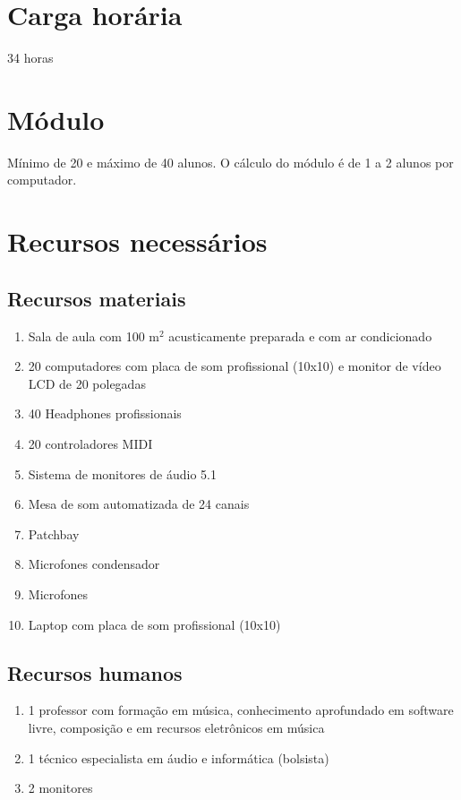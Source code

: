 \documentclass[12pt]{article}
\begin{document}
\section{Carga horária}

34 horas
 
\section{Módulo}

Mínimo de 20 e máximo de 40 alunos. O cálculo do módulo é de 1 a 2
alunos por computador.

\section{Recursos necessários}
\label{sec:material}

\subsection{Recursos materiais}

\begin{enumerate}
\item Sala de aula com 100 m$^2$ acusticamente preparada e com ar
  condicionado
\item 20 computadores com placa de som profissional (10x10) e monitor
  de vídeo LCD de 20 polegadas
\item 40 Headphones profissionais
\item 20 controladores MIDI
\item Sistema de monitores de áudio 5.1
\item Mesa de som automatizada de 24 canais
\item Patchbay
\item Microfones condensador
\item Microfones
\item Laptop com placa de som profissional (10x10)
\end{enumerate}

\subsection{Recursos humanos}

\begin{enumerate}
\item 1 professor com formação em música, conhecimento aprofundado em
  software livre, composição e em recursos eletrônicos em música
\item 1 técnico especialista em áudio e informática (bolsista)
\item 2 monitores
\end{enumerate}
\end{document}
